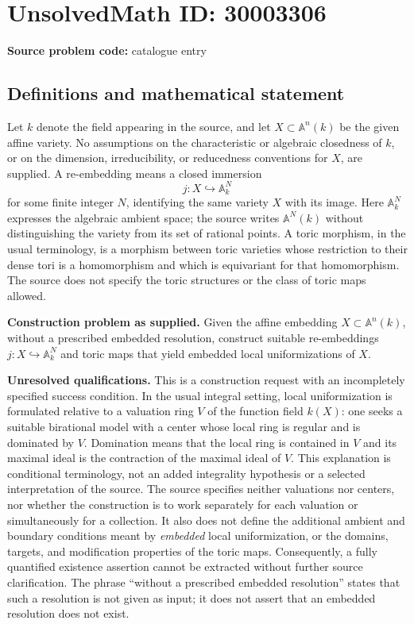 \documentclass[11pt]{article}
\begin{document}
\section*{UnsolvedMath ID: 30003306}
\textbf{Source problem code:} catalogue entry
\subsection{Definitions and mathematical statement}
Let \(k\) denote the field appearing in the source, and let \(X\subset\mathbb{A}^{n}(k)\) be the given affine variety. No assumptions on the characteristic or algebraic closedness of \(k\), or on the dimension, irreducibility, or reducedness conventions for \(X\), are supplied. A re-embedding means a closed immersion
\[
 j\colon X\hookrightarrow\mathbb{A}^{N}_{k}
\]
for some finite integer \(N\), identifying the same variety \(X\) with its image. Here \(\mathbb{A}^{N}_{k}\) expresses the algebraic ambient space; the source writes \(\mathbb{A}^{N}(k)\) without distinguishing the variety from its set of rational points. A toric morphism, in the usual terminology, is a morphism between toric varieties whose restriction to their dense tori is a homomorphism and which is equivariant for that homomorphism. The source does not specify the toric structures or the class of toric maps allowed.

\textbf{Construction problem as supplied.} Given the affine embedding \(X\subset\mathbb{A}^{n}(k)\), without a prescribed embedded resolution, construct suitable re-embeddings \(j\colon X\hookrightarrow\mathbb{A}^{N}_{k}\) and toric maps that yield embedded local uniformizations of \(X\).

\textbf{Unresolved qualifications.} This is a construction request with an incompletely specified success condition. In the usual integral setting, local uniformization is formulated relative to a valuation ring \(V\) of the function field \(k(X)\): one seeks a suitable birational model with a center whose local ring is regular and is dominated by \(V\). Domination means that the local ring is contained in \(V\) and its maximal ideal is the contraction of the maximal ideal of \(V\). This explanation is conditional terminology, not an added integrality hypothesis or a selected interpretation of the source. The source specifies neither valuations nor centers, nor whether the construction is to work separately for each valuation or simultaneously for a collection. It also does not define the additional ambient and boundary conditions meant by \emph{embedded} local uniformization, or the domains, targets, and modification properties of the toric maps. Consequently, a fully quantified existence assertion cannot be extracted without further source clarification. The phrase ``without a prescribed embedded resolution'' states that such a resolution is not given as input; it does not assert that an embedded resolution does not exist.
\end{document}
